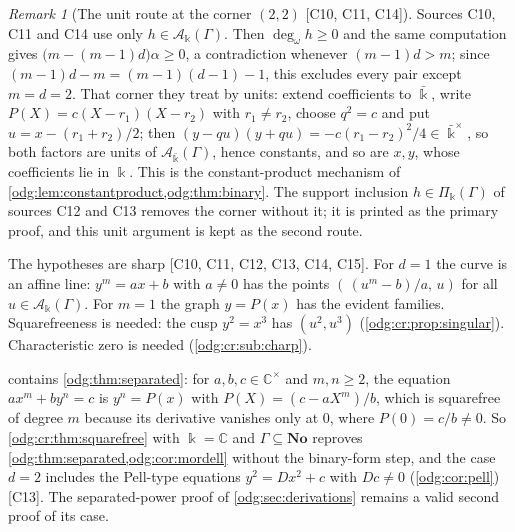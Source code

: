 \documentclass[11pt,oneside]{article}
\numberwithin{equation}{section}
\theoremstyle{definition}
\theoremstyle{remark}
\newtheorem{remark}[remark]{Remark}
\newcommand{\No}{\mathbf{No}}
\newcommand{\C}{\mathbb C}
\newcommand{\ddeg}{\operatorname{deg}_{\omega}}
\newcommand{\src}[1]{\textup{\textsf{\small[#1]}}}
\newcommand{\crA}{\mathcal A_\Bbbk(\Gamma)}
\newcommand{\crP}{\Pi_\Bbbk(\Gamma)}
\begin{document}
\begin{remark}[The unit route at the corner $(2,2)$ \src{C10, C11, C14}]\label{odg:cr:rem:unitroute}
Sources C10, C11 and C14 use only $h\in\crA$. Then $\ddeg h\ge0$ and the same
computation gives $\bigl(m-(m-1)d\bigr)\alpha\ge0$, a contradiction whenever
$(m-1)d>m$; since $(m-1)d-m=(m-1)(d-1)-1$, this excludes every pair except
$m=d=2$. That corner they treat by units: extend coefficients to $\bar\Bbbk$,
write $P(X)=c(X-r_1)(X-r_2)$ with $r_1\ne r_2$, choose $q^2=c$ and put
$u=x-(r_1+r_2)/2$; then $(y-qu)(y+qu)=-c(r_1-r_2)^2/4\in\bar\Bbbk^\times$, so both
factors are units of $\mathcal A_{\bar\Bbbk}(\Gamma)$, hence constants, and so are
$x,y$, whose coefficients lie in $\Bbbk$. This is the constant-product mechanism
of \cref{odg:lem:constantproduct,odg:thm:binary}. The support inclusion
$h\in\crP$ of sources C12 and C13 removes the corner without it; it is printed
as the primary proof, and this unit argument is kept as the second route.
\end{remark}

The hypotheses are sharp \src{C10, C11, C12, C13, C14, C15}. For $d=1$ the curve is an
affine line: $y^m=ax+b$ with $a\ne0$ has the points $(\,(u^m-b)/a,\,u)$ for all
$u\in\crA$. For $m=1$ the graph $y=P(x)$ has the evident families. Squarefreeness
is needed: the cusp $y^2=x^3$ has $(u^2,u^3)$ (\cref{odg:cr:prop:singular}).
Characteristic zero is needed (\cref{odg:cr:sub:charp}).

 contains \cref{odg:thm:separated}: for
$a,b,c\in\C^\times$ and $m,n\ge2$, the equation $ax^m+by^n=c$ is
$y^n=P(x)$ with $P(X)=(c-aX^m)/b$, which is squarefree of degree $m$ because its
derivative vanishes only at $0$, where $P(0)=c/b\ne0$. So
\cref{odg:cr:thm:squarefree} with $\Bbbk=\C$ and $\Gamma\subseteq\No$ reproves
\cref{odg:thm:separated,odg:cor:mordell} without the binary-form step, and the
case $d=2$ includes the Pell-type equations $y^2=Dx^2+c$ with $Dc\ne0$
(\cref{odg:cor:pell}) \src{C13}. The separated-power proof of
\cref{odg:sec:derivations} remains a valid second proof of its case.
\end{document}
